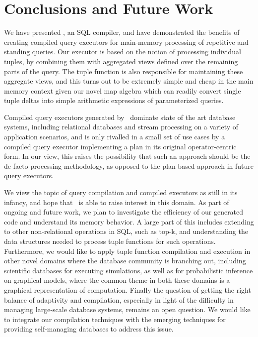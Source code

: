 \section{Conclusions and Future Work}

We have presented \compiler, an SQL compiler, and have demonstrated the
benefits of creating compiled query executors for main-memory processing of
repetitive and standing queries. Our executor is based on the notion of
processing individual tuples, by combining them with aggregated views defined
over the remaining parts of the query. The tuple function is also responsible for
maintaining these aggregate views, and this turns out to be extremely simple and
cheap in the main memory context given our novel map algebra which can readily
convert single tuple deltas into simple arithmetic expressions of parameterized
queries.

Compiled query executors generated by \compiler\ dominate state of the
art database systems, including relational databases and stream processing on a
variety of application scenarios, and is only rivalled in a small set of use
cases by a compiled query executor implementing a plan in its original
operator-centric form. In our view, this raises the possibility that such an
approach should be the de facto processing methodology, as opposed to the
plan-based approach in future query executors.

We view the topic of query compilation and compiled executors as still in its
infancy, and hope that \compiler\ is able to raise interest in this domain. 
As part of ongoing and future work, we plan to investigate the efficiency of
our generated code and understand its memory behavior. A large part of this
includes extending to other non-relational operations in SQL, such as top-k,
and understanding the data structures needed to process tuple functions for
such operations. Furthermore, we would like to apply tuple function
compilation and execution in other novel domains where the database
community is branching out, including scientific databases for executing
simulations, as well as for probabilistic inference on graphical models, where
the common theme in both these domains is a graphical representation of 
computation. Finally the question of getting the right balance of adaptivity
and compilation, especially in light of the difficulty in managing large-scale
database systems, remains an open question. We would like to integrate our
compilation techniques with the emerging techniques for providing self-managing
databases to address this issue.


